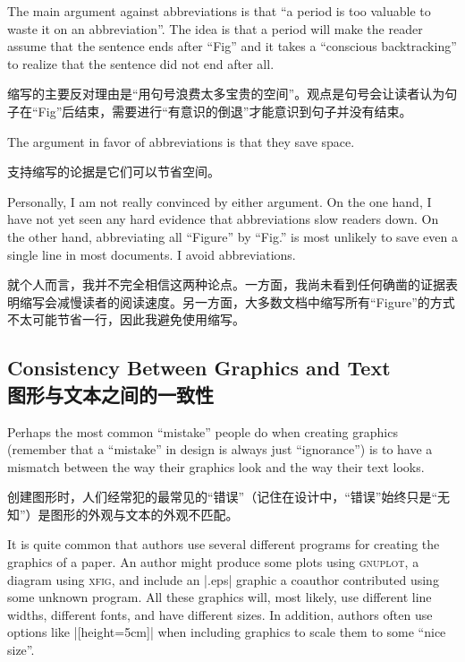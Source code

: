 \begin{itemize}
        The main argument against abbreviations is that ``a period is too
        valuable to waste it on an abbreviation''. The idea is that a period
        will make the reader assume that the sentence ends after ``Fig'' and
        it takes a ``conscious backtracking'' to realize that the sentence
        did not end after all.

        缩写的主要反对理由是“用句号浪费太多宝贵的空间”。观点是句号会让读者认为句子在“Fig”后结束，需要进行“有意识的倒退”才能意识到句子并没有结束。


        The argument in favor of abbreviations is that they save space.

        支持缩写的论据是它们可以节省空间。


        Personally, I am not really convinced by either argument. On the one
        hand, I have not yet seen any hard evidence that abbreviations slow
        readers down. On the other hand, abbreviating all ``Figure'' by
        ``Fig.'' is most unlikely to save even a single line in most documents.
        I avoid abbreviations.

        就个人而言，我并不完全相信这两种论点。一方面，我尚未看到任何确凿的证据表明缩写会减慢读者的阅读速度。另一方面，大多数文档中缩写所有“Figure”的方式不太可能节省一行，因此我避免使用缩写。

\end{itemize}


\subsection{Consistency Between Graphics and Text\\图形与文本之间的一致性}

Perhaps the most common ``mistake'' people do when creating graphics (remember
that a ``mistake'' in design is always just ``ignorance'') is to have a
mismatch between the way their graphics look and the way their text looks.

创建图形时，人们经常犯的最常见的“错误”（记住在设计中，“错误”始终只是“无知”）是图形的外观与文本的外观不匹配。


It is quite common that authors use several different programs for creating the
graphics of a paper. An author might produce some plots using \textsc{gnuplot},
a diagram using \textsc{xfig}, and include an |.eps| graphic a coauthor
contributed using some unknown program. All these graphics will, most likely,
use different line widths, different fonts, and have different sizes. In
addition, authors often use options like |[height=5cm]| when including graphics
to scale them to some ``nice size''.

